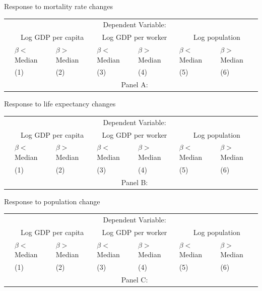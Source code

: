 \documentclass[10pt, xcolor=dvipsnames]{beamer}
\begin{document}
\begin{frame}{Response to mortality rate changes}

{\footnotesize
\begin{tabularx}{\textwidth}{lXXXXXX}
\midrule
 & \multicolumn{6}{c}{Dependent Variable:} \\ \cmidrule(lr){2-7}
 & \multicolumn{2}{c}{Log GDP per capita} & \multicolumn{2}{c}{Log GDP per worker} & \multicolumn{2}{c}{Log population} \\ \cmidrule(lr){2-3} \cmidrule(lr){4-5} \cmidrule(lr){6-7}
 & $\beta<$Median & $\beta>$Median & $\beta<$Median & $\beta>$Median & $\beta<$Median & $\beta>$Median \\
 & (1) & (2) & (3) & (4) & (5) & (6) \\
\midrule
 & \multicolumn{6}{c}{Panel A:} \\ \cmidrule(lr){2-7}

\midrule

\end{tabularx}
}
\end{frame}

\begin{frame}{Response to life expectancy changes}

{\footnotesize
\begin{tabularx}{\textwidth}{lXXXXXX}
\midrule
 & \multicolumn{6}{c}{Dependent Variable:} \\ \cmidrule(lr){2-7}
 & \multicolumn{2}{c}{Log GDP per capita} & \multicolumn{2}{c}{Log GDP per worker} & \multicolumn{2}{c}{Log population} \\ \cmidrule(lr){2-3} \cmidrule(lr){4-5} \cmidrule(lr){6-7}
 & $\beta<$Median & $\beta>$Median & $\beta<$Median & $\beta>$Median & $\beta<$Median & $\beta>$Median \\
 & (1) & (2) & (3) & (4) & (5) & (6) \\
\midrule
 & \multicolumn{6}{c}{Panel B:} \\ \cmidrule(lr){2-7}

\midrule

\end{tabularx}
}
\end{frame}

\begin{frame}{Response to population change}

{\footnotesize
\begin{tabularx}{\textwidth}{lXXXXXX}
\midrule
 & \multicolumn{6}{c}{Dependent Variable:} \\ \cmidrule(lr){2-7}
 & \multicolumn{2}{c}{Log GDP per capita} & \multicolumn{2}{c}{Log GDP per worker} & \multicolumn{2}{c}{Log population} \\ \cmidrule(lr){2-3} \cmidrule(lr){4-5} \cmidrule(lr){6-7}
 & $\beta<$Median & $\beta>$Median & $\beta<$Median & $\beta>$Median & $\beta<$Median & $\beta>$Median \\
 & (1) & (2) & (3) & (4) & (5) & (6) \\
\midrule
 & \multicolumn{6}{c}{Panel C:} \\ \cmidrule(lr){2-7}

\midrule

\end{tabularx}
}
\end{frame}
\end{document}
